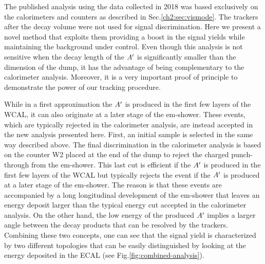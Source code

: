 The published analysis using the data collected in 2018 \cite{Banerjee:2019hmi} was based exclusively on the calorimeters and counters as described in Sec.\ref{ch2:sec:vismode}. The trackers after the decay volume were not used for signal discrimination. Here we present a novel method that exploits them providing a boost in the signal yields while maintaining the background under control. Even though this analysis is not sensitive when the decay length of the $A'$ is significantly smaller than the dimension of the dump, it has the advantage of being complementary to the calorimeter analysis. Moreover, it is a very important proof of principle to demonstrate the power of our tracking procedure.

While in a first approximation the $A'$ is produced in the first few layers of the WCAL, it can also originate at a later stage of the em-shower. These events, which are typically rejected in the calorimeter analysis, are instead accepted in the new analysis presented here. First, an initial sample is selected in the same way described above. The final discrimination in the calorimeter analysis is based on the counter W2 placed at the end of the dump to reject the charged punch-through from the em-shower. This last cut is efficient if the $A'$ is produced in the first few layers of the WCAL but typically rejects the event if the $A'$ is produced at a later stage of the em-shower. The reason is that these events are accompanied by a long longitudinal development of the em-shower that leaves an energy deposit larger than the typical energy cut accepted in the calorimeter analysis. On the other hand, the low energy of the produced $A'$ implies a larger angle between the decay products that can be resolved by the trackers. Combining these two concepts, one can see that the signal yield is characterized by two different topologies that can be easily distinguished by looking at the energy deposited in the ECAL (see Fig.\ref{fig:combined-analysis}).

